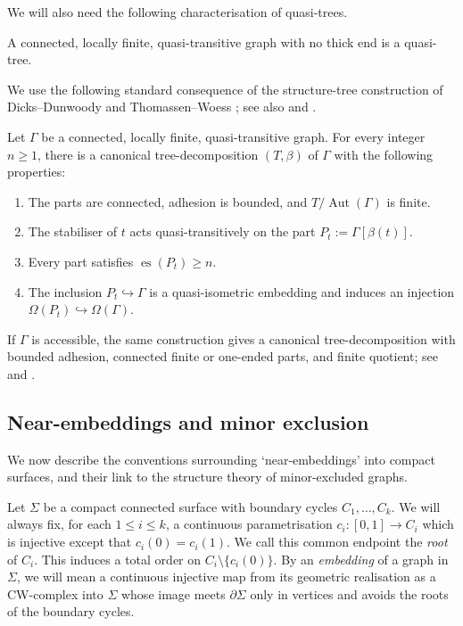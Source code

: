 \documentclass[a4paper]{amsart}
\begin{document}
We will also need the following characterisation of quasi-trees. 

\begin{theorem}[{\cite[Thm.~5.5]{KM08}}]\label{lem:thin-ended-almost-planar}
A connected, locally finite, quasi-transitive graph with no thick end is a quasi-tree.
\end{theorem}

We use the following standard consequence of the structure-tree construction of Dicks--Dunwoody \cite[Thm.~II.2.20]{dicks1989groups} and Thomassen--Woess \cite[Sec.~7]{thomassen1993vertex}; see also \cite[Sec.~4]{hamann2022stallings} and \cite[Thm.~2.15]{macmanus2023accessibility}.

\begin{proposition}\label{prop:highly-connected-parts}
Let $\Gamma$ be a connected, locally finite, quasi-transitive graph.
For every integer $n\geq1$, there is a canonical tree-decomposition $(T,\beta)$ of $\Gamma$ with the following properties:
\begin{enumerate}
\item The parts are connected, adhesion is bounded, and $T/\operatorname{Aut}(\Gamma)$ is finite.
\item The stabiliser of $t$ acts quasi-transitively on the part $P_t:=\Gamma[\beta(t)]$.
\item Every part satisfies $\operatorname{es}(P_t)\geq n$.
\item The inclusion $P_t\hookrightarrow\Gamma$ is a quasi-isometric embedding and induces an injection $\Omega(P_t)\hookrightarrow\Omega(\Gamma)$.
\end{enumerate}
\end{proposition}

If $\Gamma$ is accessible, the same construction gives a canonical tree-decomposition with bounded adhesion, connected finite or one-ended parts, and finite quotient; see \cite[Sec.~7]{thomassen1993vertex} and \cite[Thm.~6.4, Prop.~4.1]{hamann2022stallings}.

\subsection{Near-embeddings and minor exclusion}\label{subsec:near-embeddings}

We now describe the conventions surrounding `near-embeddings' into compact surfaces, and their link to the structure theory of minor-excluded graphs.

Let $\Sigma$ be a compact connected surface with boundary cycles $C_1,\ldots,C_k$.
We will always fix, for each $1 \leq i \leq k$, a continuous parametrisation $c_i:[0,1]\to C_i$ which is injective except that $c_i(0)=c_i(1)$.
We call this common endpoint the \emph{root} of $C_i$. This induces a total order on $C_i\setminus\{c_i(0)\}$.
By an \emph{embedding} of a graph in $\Sigma$, we will mean a continuous injective map from its geometric realisation as a CW-complex into $\Sigma$ whose image meets $\partial\Sigma$ only in vertices and avoids the roots of the boundary cycles.
\end{document}
